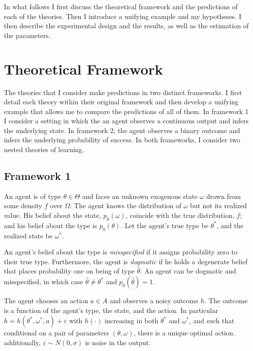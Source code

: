 \documentclass[
  12pt,
]{article}
\begin{document}
In what follows I first discuss the theoretical framework and the
predictions of each of the theories. Then I introduce a unifying example
and my hypotheses. I then describe the experimental design and the
results, as well as the estimation of the parameters.

\hypertarget{theoretical-framework}{%
\section{Theoretical Framework}\label{theoretical-framework}}

The theories that I consider make predictions in two distinct
frameworks. I first detail each theory within their original framework
and then develop a unifying example that allows me to compare the
predictions of all of them. In framework 1 I consider a setting in which
the an agent observes a continuous output and infers the underlying
state. In framework 2, the agent observes a binary outcome and infers
the underlying probability of success. In both frameworks, I consider
two nested theories of learning.

\hypertarget{framework-1}{%
\subsection{Framework 1}\label{framework-1}}

An agent is of type \(\theta \in \Theta\) and faces an unknown exogenous
state \(\omega\) drawn from some density \(f\) over \(\Omega\). The
agent knows the distribution of \(\omega\) but not its realized value.
His belief about the state, \(p_0(\omega)\), coincide with the true
distribution, \(f\); and his belief about the type is \(p_0(\theta)\).
Let the agent's true type be \(\theta^{*}\), and the realized state be
\(\omega^{*}\).

An agent's belief about the type is \emph{misspecified} if it assigns
probability zero to their true type. Furthermore, the agent is
\emph{dogmatic} if he holds a degenerate belief that places probability
one on being of type \(\hat{\theta}\). An agent can be dogmatic and
misspecified, in which case \(\hat{\theta} \neq \theta^*\) and
\(p_0(\hat{\theta}) = 1\).

The agent chooses an action \(a\in A\) and observes a noisy outcome
\(h\). The outcome is a function of the agent's type, the state, and the
action. In particular \(h = h(\theta^*, \omega^*, a) + \varepsilon\)
with \(h(\cdot)\) increasing in both \(\theta^*\) and \(\omega^*\), and
such that conditional on a pair of parameters \((\theta, \omega)\),
there is a unique optimal action. additionally,
\(\varepsilon\sim N(0, \sigma)\) is noise in the output.
\end{document}
